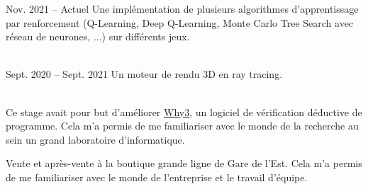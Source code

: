 \documentclass[10pt,a4paper,ragged2e,withhyper]{altacv}
\begin{document}
\begin{paracol}{2}
            {Nov. 2021 -- Actuel}{}
            Une implémentation de plusieurs algorithmes d'apprentissage par renforcement
            (Q-Learning, Deep Q-Learning, Monte Carlo Tree Search avec réseau de neurones, ...)
            sur différents jeux.\\
            \vspace{4pt}
            \\
            \vspace{4pt}
            \divider
            

            {Sept. 2020 -- Sept. 2021}{}
            Un moteur de rendu 3D en ray tracing.\\
            \vspace{4pt}
            \\
            \vspace{4pt}

            Ce stage avait pour but d'améliorer \href{http://why3.lri.fr/}{Why3}, un logiciel de vérification déductive de programme.
            Cela m'a permis de me familiariser avec le monde de la recherche au sein un grand laboratoire d'informatique.\\

            \divider

            Vente et après-vente à la boutique grande ligne de Gare de l'Est. Cela m'a permis de me familiariser avec le monde de l'entreprise et le travail d'équipe.

    \end{paracol}
\end{document}
